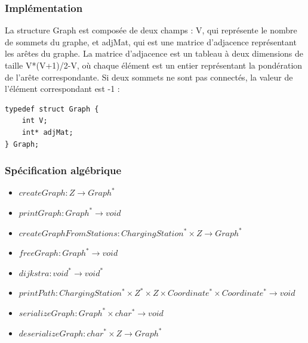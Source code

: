 \documentclass[french,a4paper]{article}
\begin{document}
\begin{center}
\end{center}

\subsubsection{Implémentation}
La structure Graph est composée de deux champs : V, qui représente le nombre de sommets du graphe, et adjMat, qui est une matrice d'adjacence représentant les arêtes du graphe. La matrice d'adjacence est un tableau à deux dimensions de taille V*(V+1)/2-V, où chaque élément est un entier représentant la pondération de l'arête correspondante. Si deux sommets ne sont pas connectés, la valeur de l'élément correspondant est -1 : \\

\begin{center}
    \begin{lstlisting}[caption=Structure du Graph]
typedef struct Graph {
    int V; 
    int* adjMat;
} Graph;
        \end{lstlisting}
\end{center}

\subsubsection{Spécification algébrique}

\begin{itemize}
    \item $createGraph : {Z} \rightarrow Graph^*$
    \item $printGraph : Graph^* \rightarrow void$
    \item $createGraphFromStations : ChargingStation^* \times {Z} \rightarrow Graph^*$
    \item $freeGraph : Graph^* \rightarrow void$
    \item $dijkstra : void^* \rightarrow void^*$
    \item $printPath : ChargingStation^* \times {Z}^* \times {Z} \times Coordinate^* \times Coordinate^* \rightarrow void$
    \item $serializeGraph : Graph^* \times char^* \rightarrow void$
    \item $deserializeGraph : char^* \times {Z} \rightarrow Graph^*$
\end{itemize}
\end{document}
